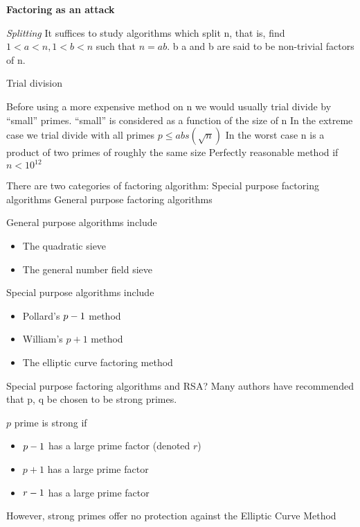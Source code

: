 \textbf{Factoring as an attack}
\begin{definition}
    \textit{Splitting}
It suffices to study algorithms which split n, that is, 
    find $1 < a < n, 1 < b < n$ such that $n = ab$.
    b a and b are said to be non-trivial factors of n.
\end{definition}

Trial division

Before using a more expensive method on n we would usually trial divide by “small” primes.
 “small” is considered as a function of the size of n
In the extreme case we trial divide with all primes $p \leq abs(\sqrt{n})$
In the worst case n is a product of two primes of roughly the same size
Perfectly reasonable method if $n < 10^{12}$

There are two categories of factoring algorithm:
Special purpose factoring algorithms
General purpose factoring algorithms

General purpose algorithms include
\begin{itemize}
    \item The quadratic sieve
    \item The general number field sieve
\end{itemize}

Special purpose algorithms include
\begin{itemize}
    \item Pollard’s $p - 1$ method
    \item William’s $p + 1$ method
    \item The elliptic curve factoring method
\end{itemize}

Special purpose factoring algorithms and RSA?
Many authors have recommended that p, q be chosen to be strong primes.
\begin{definition}
    $p$ prime is strong if
    \begin{itemize}
        \item $p - 1$ has a large prime factor (denoted $r$)
        \item $p + 1$ has a large prime factor
        \item $r - 1$ has a large prime factor
    \end{itemize}
\end{definition}

However, strong primes offer no protection against the Elliptic Curve Method

